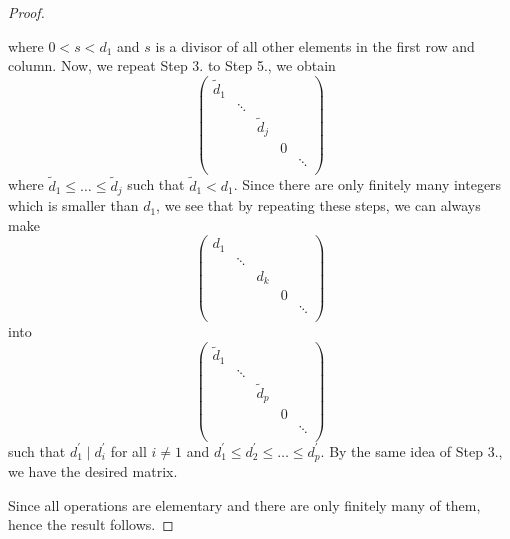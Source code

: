 \begin{proof}
\begin{itemize}
\[		      \]
		      where \(0 < s < d_1\) and \(s\) is a divisor of all other elements in the first row and column. Now, we repeat Step 3. to Step 5., we obtain
		      \[
			      \begin{pmatrix}
				      \widetilde{d} _1 &        &                    &   &        \\
				                       & \ddots &                    &   &        \\
				                       &        & \widetilde{d} _{j} &   &        \\
				                       &        &                    & 0 &        \\
				                       &        &                    &   & \ddots \\
			      \end{pmatrix}
		      \]
		      where \(\widetilde{d} _1 \leq \dots \leq \widetilde{d} _{j}  \) such that \(\widetilde{d} _1 < d_1\). Since there are only finitely many integers which is smaller than \(d_1\), we
		      see that by repeating these steps, we can always make
		      \[
			      \begin{pmatrix}
				      d_1 &        &       &   &        \\
				          & \ddots &       &   &        \\
				          &        & d_{k} &   &        \\
				          &        &       & 0 &        \\
				          &        &       &   & \ddots \\
			      \end{pmatrix}
		      \]
		      into
		      \[
			      \begin{pmatrix}
				      \widetilde{d} _1 &        &                    &   &        \\
				                       & \ddots &                    &   &        \\
				                       &        & \widetilde{d} _{p} &   &        \\
				                       &        &                    & 0 &        \\
				                       &        &                    &   & \ddots \\
			      \end{pmatrix}
		      \]
		      such that \(d_1^\prime \mid d_i^\prime \) for all \(i \neq  1\) and \(d_1^\prime \leq d_2^\prime \leq \dots \leq d_p^\prime  \). By the same idea of Step 3., we have the desired matrix.
	\end{itemize}
	Since all operations are elementary and there are only finitely many of them, hence the result follows.
\end{proof}

